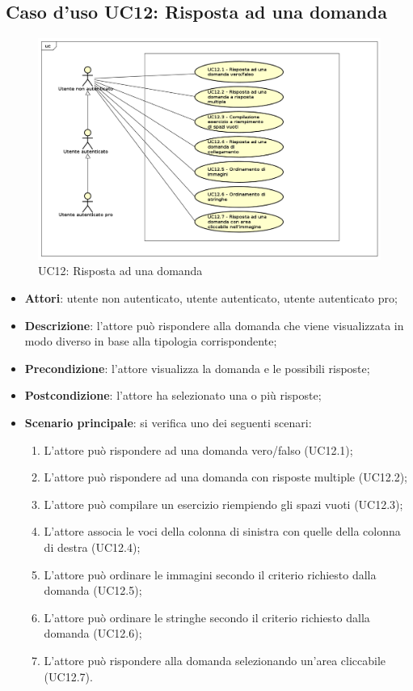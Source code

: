 \newpage
\subsection{Caso d'uso UC12: Risposta ad una domanda}
\label{UC12}
\begin{figure}[h]
	\centering
	\includegraphics[scale=0.5]{UML/UC12.png}
	\caption{UC12: Risposta ad una domanda}
\end{figure}

\begin{itemize}
\item \textbf{Attori}: utente non autenticato, utente autenticato, utente autenticato pro;
\item \textbf{Descrizione}: l'attore può rispondere alla domanda che viene visualizzata in modo diverso in base alla tipologia corrispondente;
\item \textbf{Precondizione}: l'attore visualizza la domanda e le possibili risposte;
\item \textbf{Postcondizione}: l'attore ha selezionato una o più risposte;
\item \textbf{Scenario principale}: si verifica uno dei seguenti scenari:
\begin{enumerate}
	\item L'attore può rispondere ad una domanda vero/falso (UC12.1);
	\item L'attore può rispondere ad una domanda con risposte multiple (UC12.2);
	\item L'attore può compilare un esercizio riempiendo gli spazi vuoti (UC12.3);
	\item L'attore associa le voci della colonna di sinistra con quelle della colonna di destra (UC12.4);
	\item L'attore può ordinare le immagini secondo il criterio richiesto dalla domanda (UC12.5);
	\item L'attore può ordinare le stringhe secondo il criterio richiesto dalla domanda (UC12.6);
	\item L'attore può rispondere alla domanda selezionando un'area cliccabile (UC12.7). 
\end{enumerate}
\end{itemize}


